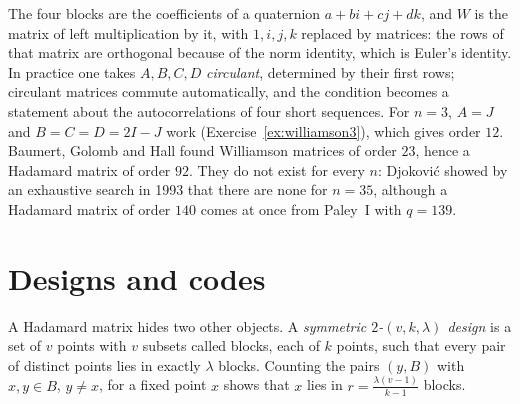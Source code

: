 The four blocks are the coefficients of a quaternion $a+bi+cj+dk$, and $W$ is the matrix of left multiplication by it, with $1,i,j,k$ replaced by
matrices: the rows of that matrix are orthogonal because of the norm identity, which is Euler's identity. In practice one takes $A,B,C,D$
\emph{circulant}, determined by their first rows; circulant matrices commute automatically, and the condition becomes a statement about the
autocorrelations of four short sequences. For $n=3$, $A=J$ and $B=C=D=2I-J$ work (Exercise~\ref{ex:williamson3}), which gives order $12$. Baumert,
Golomb and Hall found Williamson matrices of order $23$, hence a Hadamard matrix of order $92$. They do not exist for every $n$: Djokovi\'c showed by an
exhaustive search in 1993 that there are none for $n=35$, although a Hadamard matrix of order $140$ comes at once from Paley~I with $q=139$.

\section{Designs and codes}

A Hadamard matrix hides two other objects. A \emph{symmetric $2$-$(v,k,\lambda)$ design} is a set of $v$ points with $v$ subsets called blocks, each of
$k$ points, such that every pair of distinct points lies in exactly $\lambda$ blocks. Counting the pairs $(y,B)$ with $x,y\in B$, $y\neq x$, for a fixed
point $x$ shows that $x$ lies in $r=\frac{\lambda(v-1)}{k-1}$ blocks.


